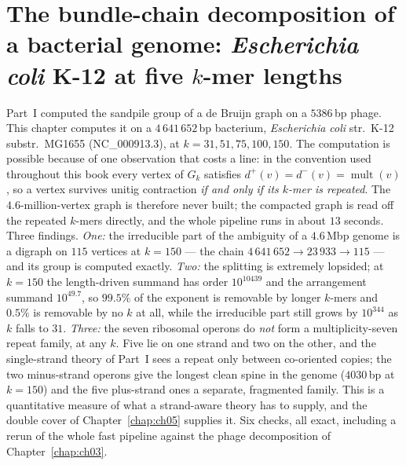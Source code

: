 \chapter[\texorpdfstring{The bundle-chain decomposition of \emph{E.~coli}}{The bundle-chain decomposition of E. coli}]{\texorpdfstring{The bundle-chain decomposition of a bacterial genome: \emph{Escherichia coli} K-12 at five $k$-mer lengths}{The bundle-chain decomposition of a bacterial genome: Escherichia coli K-12 at five k-mer lengths}}\label{chap:ch15}
\begin{chaptersummary}
Part~I computed the sandpile group of a de Bruijn graph on a $5386$\,bp
phage. This chapter computes it on a $4\,641\,652$\,bp bacterium, \emph{Escherichia coli}
str.\ K-12 substr.\ MG1655 (NC\_000913.3), at $k=31,51,75,100,150$. The computation is
possible because of one observation that costs a line: in the convention used throughout
this book every vertex of $G_k$ satisfies $d^{+}(v)=d^{-}(v)=\operatorname{mult}(v)$, so
a vertex survives unitig contraction \emph{if and only if its $k$-mer is repeated}. The
$4.6$-million-vertex graph is therefore never built; the compacted graph is read off the
repeated $k$-mers directly, and the whole pipeline runs in about $13$ seconds. Three
findings. \emph{One:} the irreducible part of the ambiguity of a $4.6$\,Mbp genome is a
digraph on $115$ vertices at $k=150$ --- the chain $4\,641\,652\to23\,933\to115$ --- and
its group is computed exactly. \emph{Two:} the splitting is extremely lopsided; at
$k=150$ the length-driven summand has order $10^{10439}$ and the arrangement summand
$10^{49.7}$, so $99.5\%$ of the exponent is removable by longer $k$-mers and $0.5\%$ is
removable by no $k$ at all, while the irreducible part still grows by $10^{344}$ as $k$
falls to $31$. \emph{Three:} the seven ribosomal operons do \emph{not} form a
multiplicity-seven repeat family, at any $k$. Five lie on one strand and two on the
other, and the single-strand theory of Part~I sees a repeat only between co-oriented
copies; the two minus-strand operons give the longest clean spine in the genome
($4030$\,bp at $k=150$) and the five plus-strand ones a separate, fragmented family. This
is a quantitative measure of what a strand-aware theory has to supply, and the double cover of
Chapter~\ref{chap:ch05} supplies it. Six checks,
all exact, including a rerun of the whole fast pipeline against the phage
decomposition of Chapter~\ref{chap:ch03}.
\end{chaptersummary}

